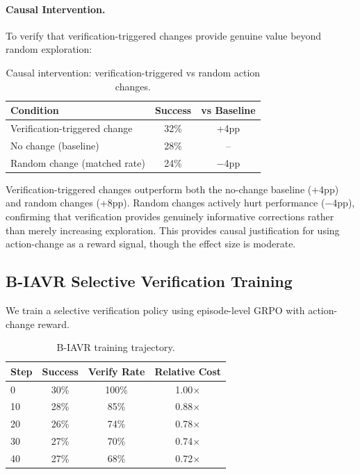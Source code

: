 \documentclass[11pt]{article}
\begin{document}
\paragraph{Causal Intervention.}
To verify that verification-triggered changes provide genuine value beyond random exploration:

\begin{table}[h]
\centering
\caption{Causal intervention: verification-triggered vs random action changes.}
\label{tab:causal}
\begin{tabular}{lcc}
\toprule
Condition & Success & vs Baseline \\
\midrule
Verification-triggered change & 32\% & +4pp \\
No change (baseline) & 28\% & -- \\
Random change (matched rate) & 24\% & $-$4pp \\
\bottomrule
\end{tabular}
\end{table}

Verification-triggered changes outperform both the no-change baseline (+4pp) and random changes (+8pp). Random changes actively hurt performance ($-$4pp), confirming that verification provides genuinely informative corrections rather than merely increasing exploration. This provides causal justification for using action-change as a reward signal, though the effect size is moderate.

\subsection{B-IAVR Selective Verification Training}

We train a selective verification policy using episode-level GRPO with action-change reward.

\begin{table}[h]
\centering
\caption{B-IAVR training trajectory.}
\label{tab:biavr}
\begin{tabular}{lccc}
\toprule
Step & Success & Verify Rate & Relative Cost \\
\midrule
0 & 30\% & 100\% & 1.00$\times$ \\
10 & 28\% & 85\% & 0.88$\times$ \\
20 & 26\% & 74\% & 0.78$\times$ \\
30 & 27\% & 70\% & 0.74$\times$ \\
40 & 27\% & 68\% & 0.72$\times$ \\
\bottomrule
\end{tabular}
\end{table}
\end{document}
